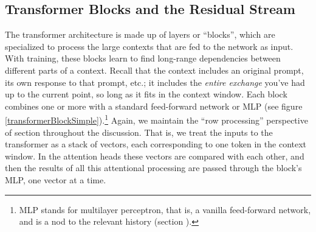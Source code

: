 \subsection{Transformer Blocks and the Residual Stream}\label{transformerBlocks}

The transformer architecture \cite{vaswani2017attention} is made up of layers
or ``blocks'', which are specialized to process the large contexts that are fed
to the network as input. With training, these blocks learn to find long-range
dependencies between different parts of a context. Recall that the context
includes an original prompt, its own response to that prompt, etc.; it includes
the \emph{entire exchange} you've had up to the current point, so long
as it fits in the context window. Each block combines one or more  with a standard feed-forward network or MLP (see figure \ref{transformerBlockSimple}).\footnote{MLP stands for multilayer perceptron, that is, a vanilla feed-forward network, and is a nod to the relevant history (section ).}
Again, we maintain the ``row processing'' perspective of section
 throughout the discussion. That is, we treat the inputs to the transformer as a stack of vectors, each corresponding to one token in the context window. In the attention heads these vectors are compared with each other, and then the results of all this attentional processing are passed through the block's MLP, one vector at a time.

